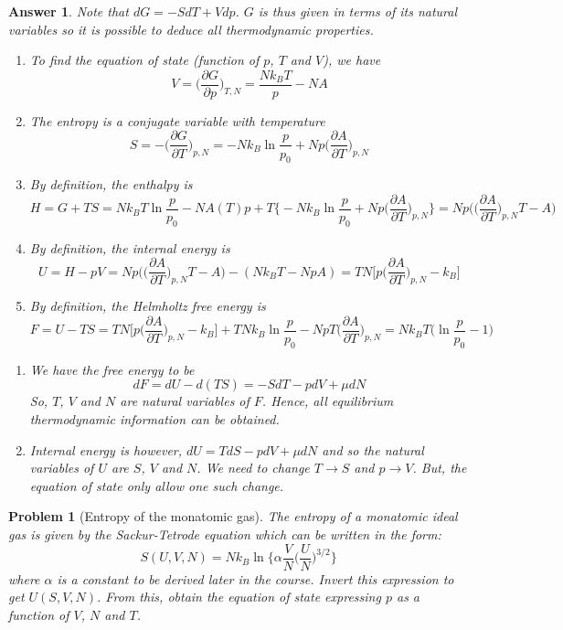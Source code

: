 \documentclass[a4paper]{article}
\newtheorem{ans}{Answer}[section]
\theoremstyle{new}
\newtheorem{qns}{Problem}[section]
\begin{document}
\begin{ans}
Note that $dG=-SdT+Vdp$. $G$ is thus given in terms of its natural variables so it is possible to deduce all thermodynamic properties.
\begin{enumerate}[label=(\alph*)]
\item To find the equation of state (function of $p$, $T$ and $V$), we have
$$V=\bigg(\frac{\partial G}{\partial p}\bigg)_{T,N}=\frac{Nk_BT}{p}-NA$$
\item The entropy is a conjugate variable with temperature
$$S=-\bigg(\frac{\partial G}{\partial T}\bigg)_{p,N}=-Nk_B\ln\frac{p}{p_0}+Np\bigg(\frac{\partial A}{\partial T}\bigg)_{p,N}$$
\item By definition, the enthalpy is
$$H=G+TS=Nk_BT\ln\frac{p}{p_0}-NA(T)p+T\bigg\{-Nk_B\ln\frac{p}{p_0}+Np\bigg(\frac{\partial A}{\partial T}\bigg)_{p,N}\bigg\}=Np\bigg(\bigg(\frac{\partial A}{\partial T}\bigg)_{p,N}T-A\bigg)$$
\item By definition, the internal energy is
$$U=H-pV=Np\bigg(\bigg(\frac{\partial A}{\partial T}\bigg)_{p,N}T-A\bigg)-(Nk_BT-NpA)=TN\bigg[p\bigg(\frac{\partial A}{\partial T}\bigg)_{p,N}-k_B\bigg]$$
\item By definition, the Helmholtz free energy is
$$F=U-TS=TN\bigg[p\bigg(\frac{\partial A}{\partial T}\bigg)_{p,N}-k_B\bigg]+TNk_B\ln\frac{p}{p_0}-NpT\bigg(\frac{\partial A}{\partial T}\bigg)_{p,N}=Nk_BT\bigg(\ln\frac{p}{p_0}-1\bigg)$$
\end{enumerate}
\begin{enumerate}[label=\roman*]
\item We have the free energy to be
$$dF=dU-d(TS)=-SdT-pdV+\mu dN$$
So, $T$, $V$ and $N$ are natural variables of $F$. Hence, all equilibrium thermodynamic information can be obtained.
\item Internal energy is however, $dU=TdS-pdV+\mu dN$ and so the natural variables of $U$ are $S$, $V$ and $N$. We need to change $T\rightarrow S$ and $p\rightarrow V$. But, the equation of state only allow one such change.
\end{enumerate}
\end{ans}
\begin{qns}[Entropy of the monatomic gas]
The entropy of a monatomic ideal gas is given by the Sackur-Tetrode equation which can be written in the form:
$$S(U,V,N)=Nk_B\ln\bigg\{\alpha\frac{V}{N}\bigg(\frac{U}{N}\bigg)^{3/2}\bigg\}$$
where $\alpha$ is a constant to be derived later in the course. Invert this expression to get $U(S, V, N)$. From this, obtain the equation of state expressing $p$ as a function of $V$, $N$ and $T$.
\end{qns}
\end{document}
